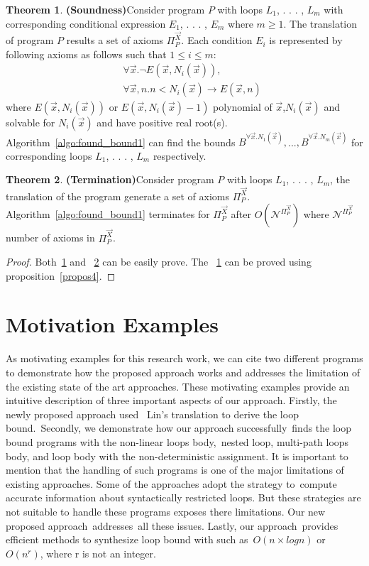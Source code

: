 \documentclass[12pt]{extarticle}
\theoremstyle{definition}
\newtheorem{theorem}{Theorem}[section]
\begin{document}
\begin{theorem}\textbf{(Soundness)}\label{thm1}
Consider program $P$ with loops $L_1$, . . . , $L_m$ with corresponding conditional expression $E_1$, . . . , $E_m$ where $m\geq 1$.  The translation of program $P$ results a set of axioms $\Pi^{\vec{X}}_{P}$. Each condition $E_i$ is represented by following axioms as follows such that $1\leq i \leq m$:
\begin{eqnarray}
&&  \forall \vec{x}.\neg E(\vec{x},N_i(\vec{x})), \label{smallest7}\\
&& \forall \vec{x},n. n< N_i(\vec{x})\rightarrow  E(\vec{x},n) \label{smallest8}
\end{eqnarray}
where $E(\vec{x},N_i(\vec{x}))$ or $E(\vec{x},N_i(\vec{x})-1)$ polynomial of $\vec{x}$,$N_i(\vec{x})$ and solvable for $N_i(\vec{x})$ and have positive real root(s).
Algorithm~\ref{algo:found_bound1} can find the bounds  $B^{\forall \vec{x}.N_1(\vec{x})},$...$,B^{\forall \vec{x}.N_m(\vec{x})}$ for corresponding loops  $L_1$, . . . , $L_m$ respectively.
\end{theorem}
\begin{theorem}\textbf{(Termination)}\label{thm2}
Consider program $P$ with loops $L_1$, . . . , $L_m$, the translation of the program generate a set of axioms $\Pi_{P}^{\vec{X}}$. Algorithm~\ref{algo:found_bound1} terminates for $\Pi_{P}^{\vec{X}}$ after $O(\mathcal{N}^{\Pi_{P}^{\vec{X}}})$ where $\mathcal{N}^{\Pi_{P}^{\vec{X}}}$ number of axioms in $\Pi_{P}^{\vec{X}}$.
\end{theorem}
\begin{proof}
Both~\ref{thm1} and ~\ref{thm2} can be easily prove. The ~\ref{thm1} can be proved using proposition~\ref{propos4}.
\end{proof}

\section{Motivation Examples}
As motivating examples for this research work, we can cite two different programs to demonstrate how the proposed approach works and addresses the limitation of the existing state of the art approaches. These motivating examples provide an intuitive description of three important aspects of our approach. Firstly, the newly proposed approach used  Lin's translation to derive the loop bound. Secondly, we demonstrate how our approach successfully finds the loop bound programs with the non-linear loops body, nested loop, multi-path loops body, and loop body with the non-deterministic assignment. It is important to mention that the handling of such programs is one of the major limitations of existing approaches. Some of the approaches adopt the strategy to compute accurate information about syntactically restricted loops. But these strategies are not suitable to handle these programs exposes there limitations. Our new proposed approach addresses all these issues. Lastly, our approach provides efficient methods to synthesize loop bound with such as $O(n \times log n)$ or $O(n^r)$, where r is not an integer.
\end{document}
